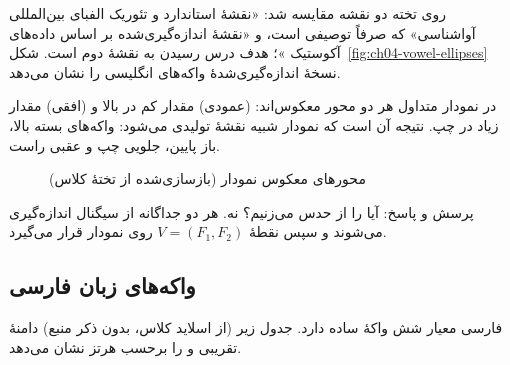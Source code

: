 روی تخته دو نقشه مقایسه شد: «نقشهٔ استاندارد و تئوریک الفبای بین‌المللی آواشناسی» که صرفاً توصیفی است، و «نقشهٔ اندازه‌گیری‌شده بر اساس داده‌های آکوستیک »؛ هدف درس رسیدن به نقشهٔ دوم است. شکل~\ref{fig:ch04-vowel-ellipses} نسخهٔ اندازه‌گیری‌شدهٔ واکه‌های انگلیسی را نشان می‌دهد.

\label{fig:ch04-vowel-ellipses}

در نمودار متداول هر دو محور معکوس‌اند:  (عمودی) مقدار کم در بالا و  (افقی) مقدار زیاد در چپ. نتیجه آن است که نمودار شبیه نقشهٔ تولیدی می‌شود: واکه‌های بسته بالا، باز پایین، جلویی چپ و عقبی راست.

\begin{figure}[htbp]
\centering
{}
\caption{محورهای معکوس نمودار  (بازسازی‌شده از تختهٔ کلاس)}
\end{figure}

\begin{exambox}{پرسش و پاسخ: آیا  را از  حدس می‌زنیم؟}
نه. هر دو جداگانه از سیگنال اندازه‌گیری می‌شوند و سپس نقطهٔ $V=(F_1,F_2)$ روی نمودار قرار می‌گیرد.
\end{exambox}

\subsection{واکه‌های زبان فارسی}
فارسی معیار شش واکهٔ ساده دارد. جدول زیر (از اسلاید کلاس، بدون ذکر منبع) دامنهٔ تقریبی  و  را برحسب هرتز نشان می‌دهد.

